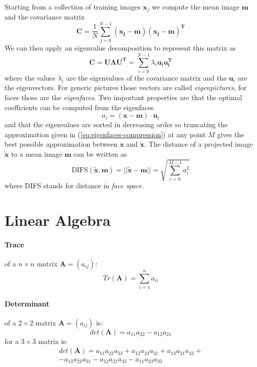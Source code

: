\documentclass[a4paper,twocolumn]{article}
\begin{document}
Starting from a collection of training images ${\mathbf{x}_j}$ we compute the
mean image $\mathbf{m}$ and the covariance matrix
\begin{equation}
	\mathbf{C}=\frac{1}{N}\sum_{j=0}^{N-1}\mathbf{(x_j-m)(x_j-m)^T}
\end{equation}
We can then apply an eigenvalue decomposition to represent this matrix as
\begin{equation}
	\mathbf{C}=\mathbf{U\Lambda U^T}=\sum_{i=0}^{N-1}\lambda_i\mathbf{u_iu_i^T}
\end{equation}
where the values $\lambda_i$ are the eigenvalues of the covariance matrix and
the $\mathbf{u}_i$ are the eigenvectors. For generic pictures those vectors are
called \textit{eigenpictures}, for faces those are the \textit{eigenfaces}.
Two important properties are that the optimal coefficients can be computed from
the eigenfaces
\begin{equation}
	a_i = (\mathbf{x - m}) \cdot \mathbf{u}_i
\end{equation}
and that the eigenvalues are sorted in decreasing order so truncating the
approximation given in (\ref{eq:eigenfaces-compression}) at any point $M$ gives
the best possible approximation between $\mathbf{x}$ and $\tilde{\mathbf{x}}$.
The distance of a projected image $\tilde{\mathbf{x}}$ to a mean image
$\mathbf{m}$ can be written as
\begin{equation}
	\text{DIFS}(\tilde{\mathbf{x}},\mathbf{m})=
		||\mathbf{\tilde{x}-m}||=\sqrt{\sum_{i=0}^{M-1}a_i^2}
\end{equation}
where DIFS stands for distance in \textit{face space}.




\newpage

\appendix
\section{Linear Algebra}
\paragraph{Trace} of a $n \times n$ matrix $\mathbf{A} = (a_{ij})$:
\begin{equation}
	Tr(\mathbf{A}) = \sum_{i=1}^n a_{ii}
\end{equation}
\paragraph{Determinant} of a $2 \times 2$ matrix $\mathbf{A} = (a_{ij})$ is:
\begin{equation}
	det(\mathbf{A}) = a_{11} a_{22} - a_{12} a_{21}
\end{equation}
for a $3 \times 3$ matrix is:
\begin{multline*}
	det(\mathbf{A}) = a_{11} a_{22} a_{33} + a_{12} a_{23} a_{31} +
	a_{13} a_{21} a_{32} + \\ - a_{13} a_{22} a_{31} - a_{12} a_{21}
	a_{33} - a_{11} a_{23} a_{32}
\end{multline*}
\end{document}
